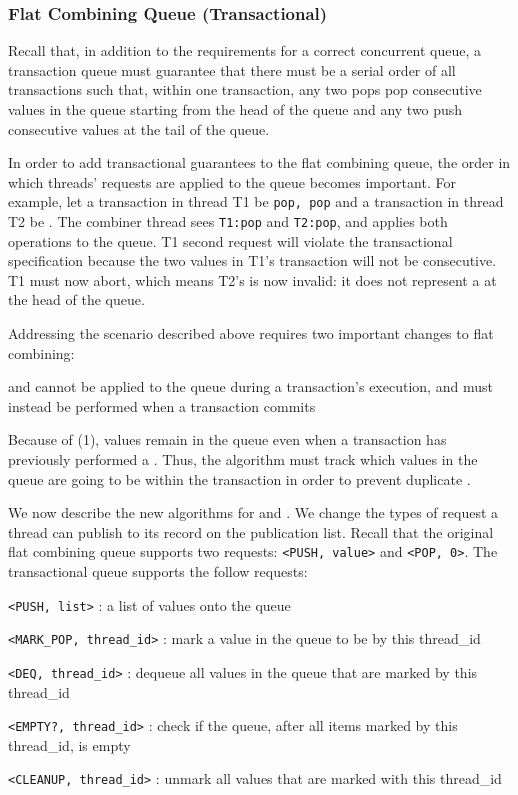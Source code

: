 \subsubsection{Flat Combining Queue (Transactional)}

Recall that, in addition to the requirements for a correct concurrent queue, a transaction queue must guarantee that there must be a serial order of all transactions such that, within one transaction, any two pops pop consecutive values in the queue starting from the head of the queue and any two \pushes push consecutive values at the tail of the queue.

In order to add transactional guarantees to the flat combining queue, the order in which threads’ requests are applied to the queue becomes important. For example, let a transaction in thread T1 be \texttt{pop, pop} and a transaction in thread T2 be \pop. The combiner thread sees \texttt{T1:pop} and \texttt{T2:pop}, and applies both operations to the queue. T1 second \pop request will violate the transactional specification because the two \popped values in T1’s transaction will not be consecutive. T1 must now abort, which means T2’s \pop is now invalid: it does not represent a \pop at the head of the queue.

Addressing the scenario described above requires two important changes to flat combining: 
\begin{ordlist}
\item \pops and \pushes cannot be applied to the queue during a transaction’s execution, and must instead be performed when a transaction commits
\item Because of (1), values remain in the queue even when a transaction has previously performed a \pop. Thus, the algorithm must track which values in the queue are going to be \popped within the transaction in order to prevent duplicate \pops.
\end{ordlist}

We now describe the new algorithms for \push and \pop.  We change the types of request a thread can publish to its record on the publication list. Recall that the original flat combining queue supports two requests: \texttt{<PUSH, value>} and \texttt{<POP, 0>}. The transactional queue supports the follow requests:
\begin{bullets}
    \item \texttt{<PUSH, list>} : \push a list of values onto the queue
    \item \texttt{<MARK\_POP, thread\_id>} : mark a value in the queue to be \popped by this thread\_id
    \item \texttt{<DEQ, thread\_id>} : dequeue all values in the queue that are marked by this thread\_id
    \item \texttt{<EMPTY?, thread\_id>} : check if the queue, after \popping all items marked by this thread\_id, is empty
    \item \texttt{<CLEANUP, thread\_id>} : unmark all values that are marked with this thread\_id
\end{bullets}

